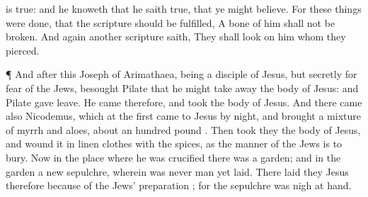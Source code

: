 {is
true: and
he
knoweth
that he
saith
true,
that
ye might
believe.
For these
things were
done,
that the
scripture should be
fulfilled, A
bone of
him
shall
not be
broken.
And
again
another
scripture
saith, They shall
look
on him
whom they
pierced.
\par }{\PP {}¶
And
after
this
Joseph
of
Arimathaea,
being a
disciple of
Jesus,
but
secretly
for
fear of the
Jews,
besought
Pilate
that he might take
away the
body of
Jesus:
and
Pilate
gave
{}
leave. He
came
therefore,
and
took the
body of
Jesus.
And there
came
also
Nicodemus,
which at the
first
came
to
Jesus by
night, and
brought a
mixture of
myrrh
and
aloes,
about an
hundred
pound
{}.
Then took
they the
body of
Jesus,
and
wound
it in linen
clothes
with the
spices,
as the
manner of the
Jews
is to
bury.
Now
in the
place
where he was
crucified there
was a
garden;
and
in the
garden a
new
sepulchre,
wherein
was never
man
yet
laid.
There laid
they
Jesus
therefore
because of the
Jews’
preparation
{};
for the
sepulchre
was nigh at
hand.

}
